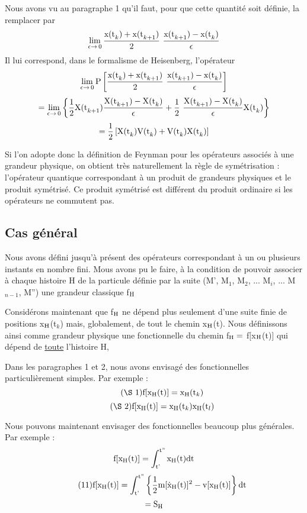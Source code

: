 Nous avons vu au paragraphe 1 qu'il faut, pour que cette
quantité soit définie, la remplacer par
\[
\lim_{\epsilon\to\, 0}\frac{\mt{x(t}_k)+\mt{x(t}_{k+1})}{2}\ \frac{\mt{x(t}_{k+1})-\mt{x(t}_k)}{\epsilon}
\]
Il lui correspond, dans le formalisme de Heisenberg, l'opérateur
\[
\lim_{\epsilon\to\, 0}\mt{P}\left[\frac{\mt{x(t}_k)+\mt{x(t}_{k+1})}{2}\ \frac{\mt{x(t}_{k+1})-\mt{x(t}_k)}{\epsilon}\right]
\]
\[
=\lim_{\epsilon\to\, 0}\left\{\frac{1}{2}\mt{X(t}_{k+1})\frac{\mt{X(t}_{k+1})-\mt{X(t}_k)}{\epsilon}+
\frac{1}{2}\ \frac{\mt{X(t}_{k+1})-\mt{X(t}_k)}{\epsilon}\mt{X(t}_k)\right\}
\]
\[
=\frac{1}{2}\left[\text{X(t}_k)\text{V(t}_k)+
\text{V(t}_k)\text{X(t}_k)\right]
\]


Si l'on adopte donc la définition de Feynman pour les opérateurs
associés à une grandeur physique, on obtient très naturellement la règle de
symétrisation : l'opérateur quantique correspondant à un produit de grandeurs
physiques et le produit symétrisé. Ce produit symétrisé est différent du
produit ordinaire si les opérateurs ne commutent pas.

\subsection{Cas général} %

Nous avons défini jusqu'à présent des opérateurs correspondant à
un ou plusieurs instants en nombre fini. Mous avons pu le faire, à la condition
de pouvoir associer à chaque histoire H de la particule définie par la
suite (M', M$_1$, M$_2$, ... M$_i$, ... M$_{n-1}$, M'') une grandeur classique f$_{\text{H}}$

Considérons maintenant que f$_{\text{H}}$ ne dépend plus seulement d'une
suite finie de positions x$_{\text{H}}$(t$_k$) mais, globalement, de tout le chemin x$_{\text{H}}$(t).
Nous définissons ainsi comme grandeur physique une fonctionnelle du
chemin f$_{\text{H}}=$ f$[$x$_{\text{H}}$(t)$]$ qui dépend de \ul{toute} l'histoire H,

Dans les paragraphes 1 et 2, nous avons envisagé des fonctionnelles particulièrement simples. Par exemple :
\[
\tag{\S 1}\mt{f}[\mt{x}_\mt{H}(\mt{t})]=\mt{x}_\mt{H}(\mt{t}_k)
\]
\[
\tag{\S 2}\mt{f}[\mt{x}_\mt{H}(\mt{t})]=\mt{x}_\mt{H}(\mt{t}_k)\mt{x}_\mt{H}(\mt{t}_l)
\]

Nous pouvons maintenant envisager des fonctionnelles beaucoup
plus générales. Par exemple :
\[
\text{f}[\text{x}_{\text{H}}(\text{t})]=\int_{\text{t'}}^{\text{t''}}\text{x}_{\text{H}}\text{(t)dt}
\]
\[
\tag{11}\text{f}[\text{x}_{\text{H}}(\text{t})]=\int_{\text{t'}}^{\text{t''}}\left\{\frac{1}{2}\text{m}[\dot{\text{x}}_{\text{H}}\text{(t)}]^2-\text{v}[\text{x}_{\text{H}}(\text{t})]\right\}\text{dt}
\]
\[
=\text{S}_{\text{H}}
\]

